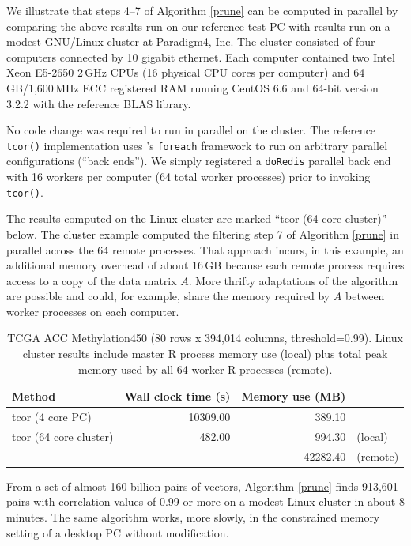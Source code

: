 \documentclass[article]{jss}
\numberwithin{algorithmctr}{section}
\begin{document}
We illustrate that steps 4--7 of Algorithm \ref{prune} can be computed in
parallel by comparing the above results run on our reference test PC with
results run on a modest GNU/Linux cluster at Paradigm4, Inc. The cluster
consisted of four computers connected by 10 gigabit ethernet. Each computer
contained two Intel Xeon E5-2650 2$\,$GHz CPUs (16 physical CPU cores per
computer) and 64$\,$GB/1,600$\,$MHz ECC registered RAM running CentOS 6.6 and
64-bit  version 3.2.2 with the reference  BLAS library.

No code change was required to run in parallel on the cluster. The reference 
{\tt tcor()} implementation uses 's {\tt foreach} \citep{foreach} framework to
run on arbitrary parallel configurations (``back ends''). We simply registered
a {\tt doRedis} \citep{doredis} parallel back end with 16  workers per computer
(64 total  worker processes) prior to invoking {\tt tcor()}.

The results computed on the Linux cluster are marked ``tcor (64 core cluster)''
below. The cluster example computed the filtering step 7 of Algorithm
\ref{prune} in parallel across the 64 remote  processes. That approach incurs,
in this example, an additional memory overhead of about 16$\,$GB because each
remote  process requires access to a copy of the data matrix $A$. More thrifty
adaptations of the algorithm are possible and could, for example, share the
memory required by $A$ between worker  processes on each computer.

\begin{table}[ht]
\centering
{\small
\begin{tabular}{lrrl}
  \hline
Method & Wall clock time (s) & Memory use (MB) &   \\ 
  \hline
tcor (4 core PC) & 10309.00 & 389.10 &  \\ 
  tcor (64 core cluster) & 482.00 & 994.30 & (local) \\ 
   &  & 42282.40 & (remote) \\ 
   \hline
\end{tabular}
}
\caption{TCGA ACC Methylation450 (80 rows x 394,014 columns, threshold=0.99). Linux cluster results include master R process memory use (local) plus total peak memory used by all 64 worker R processes (remote).} 
\label{TCGA3}
\end{table}From a set of almost 160 billion pairs of vectors, Algorithm \ref{prune} finds 913,601
pairs with correlation values of 0.99 or more on a modest Linux
cluster in about 8 minutes. The same algorithm works, more slowly, in
the constrained memory setting of a desktop PC without modification.
\end{document}
